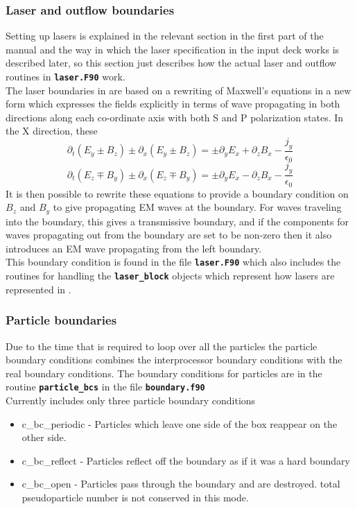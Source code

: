 \documentclass[12pt,a4paper]{article}
\newcommand{\inlinecode}[1]{{\color{warwickred} \bf\texttt{#1}}}
\newcommand{\EPOCH}{{\color{warwickdark}\fontfamily{phv}\selectfont{EPOCH}}}
\begin{document}
\subsubsection{Laser and outflow boundaries}
Setting up lasers is explained in the relevant section in the first part of the
manual and the way in which the laser specification in the input deck works is
described later, so this section just describes how the actual laser and
outflow routines in \inlinecode{laser.F90} work. \\

The laser boundaries in {\EPOCH} are based on a rewriting of Maxwell's equations
in a new form which expresses the fields explicitly in terms of wave
propagating in both directions along each co-ordinate axis with both S and P
polarization states. In the X direction, these
\[
\partial_t(E_y \pm B_z) \pm \partial_x(E_y \pm B_z) = \pm \partial_yE_x
+ \partial_zB_x -\frac{j_y}{\epsilon_0}
\]
\[
\partial_t(E_z \mp B_y) \pm \partial_x(E_z \mp B_y) = \pm \partial_yE_x
- \partial_zB_x -\frac{j_y}{\epsilon_0}
\]
It is then possible to rewrite these equations to provide a boundary condition
on $B_z$ and $B_y$ to give propagating EM waves at the boundary. For waves
traveling into the boundary, this gives a transmissive boundary, and if the
components for waves propagating out from the boundary are set to be non-zero
then it also introduces an EM wave propagating from the left boundary.\\

This boundary condition is found in the file \inlinecode{laser.F90} which also
includes the routines for handling the \inlinecode{laser\_block} objects which
represent how lasers are represented in \EPOCH.

\subsubsection{Particle boundaries}
Due to the time that is required to loop over all the particles the particle
boundary conditions {\EPOCH} combines the interprocessor boundary conditions with
the real boundary conditions. The boundary conditions for particles are in the
routine \inlinecode{particle\_bcs} in the file \inlinecode{boundary.f90} \\
Currently {\EPOCH} includes only three particle boundary conditions
\begin{itemize}
\item c\_bc\_periodic - Particles which leave one side of the box reappear on the
  other side.
\item c\_bc\_reflect - Particles reflect off the boundary as if it was a hard
  boundary
\item c\_bc\_open - Particles pass through the boundary and are destroyed. total
  pseudoparticle number is not conserved in this mode.
\end{itemize}
\end{document}
